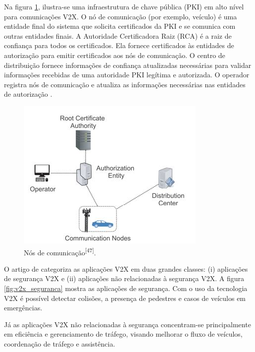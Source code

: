 Na figura \ref{fig:nos_de_comunicacao}, ilustra-se uma infraestrutura de chave pública (PKI) em alto nível para comunicações V2X. O nó de comunicação (por exemplo, veículo) é uma entidade final do sistema que solicita certificados da PKI e se comunica com outras entidades finais. A Autoridade Certificadora Raiz (RCA) é a raiz de confiança para todos os certificados. Ela fornece certificados às entidades de autorização para emitir certificados aos nós de comunicação. O centro de distribuição fornece informações de confiança atualizadas necessárias para validar informações recebidas de uma autoridade PKI legítima e autorizada. O operador registra nós de comunicação e atualiza as informações necessárias nas entidades de autorização \cite{M. Hasan, 2020}.

\begin{figure}[hp]
    \centering
    
    \includegraphics[]{figures/nos_de_comunicacao.jpg}
    
    \caption{Nós de comunicação\textsuperscript{[47]}.}
    
    \label{fig:nos_de_comunicacao}
\end{figure}

O artigo de \cite{Xuyu Wang, 2017} categoriza as aplicações V2X em duas grandes classes: (i) aplicações de segurança V2X e (ii) aplicações não relacionadas à segurança V2X. A figura \ref{fig:v2x_seguranca} mostra as aplicações de segurança. Com o uso da tecnologia V2X é possível detectar colisões, a presença de pedestres e casos de veículos em emergências.

Já as aplicações V2X não relacionadas à segurança concentram-se principalmente em eficiência e gerenciamento de tráfego, visando melhorar o fluxo de veículos, coordenação de tráfego e assistência.






